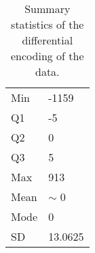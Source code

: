\begin{table}
    \caption{\label{tab:diff} Summary statistics of the differential encoding of the data.}
    \begin{tabular}{|l|l|}
        \hline
Min & -1159\\
	    Q1 & -5\\

Q2 & 0\\
	    Q3 & 5\\
Max & 913\\
\hline
Mean & $\sim$ 0\\
	    Mode & 0\\
SD & 13.0625\\
	\hline
    \end{tabular}
\end{table}
